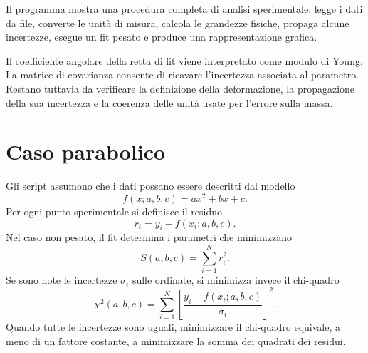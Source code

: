 \documentclass[11pt,a4paper]{book}
\begin{document}
Il programma mostra una procedura completa di analisi sperimentale: legge i dati da file, converte le unità di misura, calcola le grandezze fisiche, propaga alcune incertezze, esegue un fit pesato e produce una rappresentazione grafica.

Il coefficiente angolare della retta di fit viene interpretato come modulo di Young. La matrice di covarianza consente di ricavare l'incertezza associata al parametro. Restano tuttavia da verificare la definizione della deformazione, la propagazione della sua incertezza e la coerenza delle unità usate per l'errore sulla massa.








%



\section{Caso parabolico}
Gli script assumono che i dati possano essere descritti dal modello
\[
 f(x;a,b,c)=ax^2+bx+c.
\]
Per ogni punto sperimentale si definisce il residuo
\[
 r_i=y_i-f(x_i;a,b,c).
\]
Nel caso non pesato, il fit determina i parametri che minimizzano
\[
 S(a,b,c)=\sum_{i=1}^{N}r_i^2.
\]
Se sono note le incertezze $\sigma_i$ sulle ordinate, si minimizza invece il chi-quadro
\[
 \chi^2(a,b,c)=\sum_{i=1}^{N}
 \left[\frac{y_i-f(x_i;a,b,c)}{\sigma_i}\right]^2.
\]
Quando tutte le incertezze sono uguali, minimizzare il chi-quadro equivale, a meno di un fattore costante, a minimizzare la somma dei quadrati dei residui.
\end{document}
